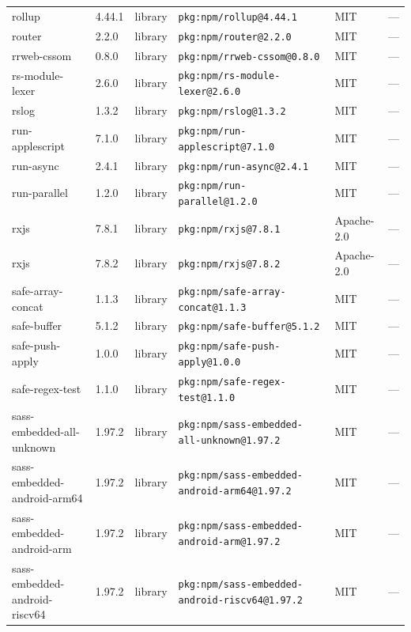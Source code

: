 \documentclass[11pt,a4paper]{article}
\begin{document}
\begin{longtable}{|p{4cm}|p{2cm}|p{1.6cm}|p{5cm}|p{1.5cm}|p{3.5cm}|}
\raggedright rollup & 4.44.1 & library & \small\texttt{pkg:npm/rollup@4.44.1} & MIT & \small — \\
\raggedright router & 2.2.0 & library & \small\texttt{pkg:npm/router@2.2.0} & MIT & \small — \\
\raggedright rrweb-cssom & 0.8.0 & library & \small\texttt{pkg:npm/rrweb-cssom@0.8.0} & MIT & \small — \\
\raggedright rs-module-lexer & 2.6.0 & library & \small\texttt{pkg:npm/rs-module-lexer@2.6.0} & MIT & \small — \\
\raggedright rslog & 1.3.2 & library & \small\texttt{pkg:npm/rslog@1.3.2} & MIT & \small — \\
\raggedright run-applescript & 7.1.0 & library & \small\texttt{pkg:npm/run-applescript@7.1.0} & MIT & \small — \\
\raggedright run-async & 2.4.1 & library & \small\texttt{pkg:npm/run-async@2.4.1} & MIT & \small — \\
\raggedright run-parallel & 1.2.0 & library & \small\texttt{pkg:npm/run-parallel@1.2.0} & MIT & \small — \\
\raggedright rxjs & 7.8.1 & library & \small\texttt{pkg:npm/rxjs@7.8.1} & Apache-2.0 & \small — \\
\raggedright rxjs & 7.8.2 & library & \small\texttt{pkg:npm/rxjs@7.8.2} & Apache-2.0 & \small — \\
\raggedright safe-array-concat & 1.1.3 & library & \small\texttt{pkg:npm/safe-array-concat@1.1.3} & MIT & \small — \\
\raggedright safe-buffer & 5.1.2 & library & \small\texttt{pkg:npm/safe-buffer@5.1.2} & MIT & \small — \\
\raggedright safe-push-apply & 1.0.0 & library & \small\texttt{pkg:npm/safe-push-apply@1.0.0} & MIT & \small — \\
\raggedright safe-regex-test & 1.1.0 & library & \small\texttt{pkg:npm/safe-regex-test@1.1.0} & MIT & \small — \\
\raggedright sass-embedded-all-unknown & 1.97.2 & library & \small\texttt{pkg:npm/sass-embedded-all-unknown@1.97.2} & MIT & \small — \\
\raggedright sass-embedded-android-arm64 & 1.97.2 & library & \small\texttt{pkg:npm/sass-embedded-android-arm64@1.97.2} & MIT & \small — \\
\raggedright sass-embedded-android-arm & 1.97.2 & library & \small\texttt{pkg:npm/sass-embedded-android-arm@1.97.2} & MIT & \small — \\
\raggedright sass-embedded-android-riscv64 & 1.97.2 & library & \small\texttt{pkg:npm/sass-embedded-android-riscv64@1.97.2} & MIT & \small — \\

\end{longtable}
\end{document}
